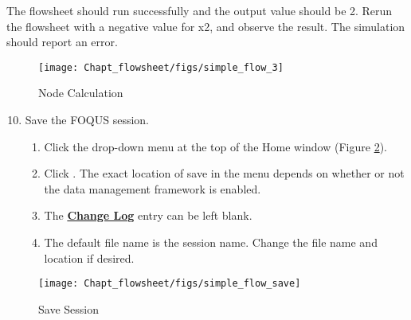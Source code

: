 The flowsheet should run successfully and the output value should be 2. Rerun the flowsheet with a negative value for x2, and observe the result. The simulation should report an error.

\begin{figure}[H]
	\begin{center}
		\texttt{[image: Chapt\_flowsheet/figs/simple\_flow\_3]}
		\caption{Node Calculation}
		\label{fig.simple.flow3}
	\end{center}
\end{figure}

\begin{enumerate}
	\setcounter{enumi}{9}
	\item Save the FOQUS session.
	\begin{enumerate}
		\item Click the  drop-down menu at the top of the Home window (Figure \ref{fig.simple.flow.save}).
		\item Click . The exact location of save in the menu depends on whether or not the data management framework is enabled.
		\item The \textbf{\underline{Change Log}} entry can be left blank.
		\item The default file name is the session name. Change the file name and location if desired.
	\end{enumerate}
\end{enumerate}

\begin{figure}[H]
	\begin{center}
		\texttt{[image: Chapt\_flowsheet/figs/simple\_flow\_save]}
		\caption{Save Session}
		\label{fig.simple.flow.save}
	\end{center}
\end{figure}


